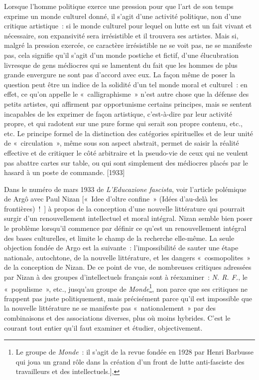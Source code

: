 \documentclass[french,twoside]{book} %
\begin{document}
Lorsque l’homme politique exerce une pression pour que l’art de son temps exprime un monde culturel donné, il s’agit d’une activité politique, non d’une critique artistique : si le monde culturel pour lequel on lutte est un fait vivant et nécessaire, son expansivité sera irrésistible et il trouvera ses artistes. Mais si, malgré la pression exercée, ce caractère irrésistible ne se voit pas, ne se manifeste pas, cela signifie qu’il s’agit d’un monde postiche et fictif, d’une élucubration livresque de gens médiocres qui se lamentent du fait que les hommes de plus grande envergure ne sont pas d’accord avec eux. La façon même de poser la question peut être un indice de la solidité d’un tel monde moral et culturel : en effet, ce qu’on appelle le « calligraphisme » n’est autre chose que la défense des petits artistes, qui affirment par opportunisme certains principes, mais se sentent incapables de les exprimer de façon artistique, c’est-à-dire par leur activité propre, et qui radotent sur une pure forme qui serait son propre contenu, etc., etc. Le principe formel de la distinction des catégories spirituelles et de leur unité de « circulation », même sous son aspect abstrait, permet de saisir la réalité effective et de critiquer le côté arbitraire et la pseudo-vie de ceux qui ne veulent pas abattre cartes sur table, ou qui sont simplement des médiocres placés par le hasard à un poste de commande. [1933]\par
Dans le numéro de mars 1933 de \emph{L'Educazione fascista}, voir l’article polémique de Argô avec Paul Nizan [« Idee d’oltre confine » (Idées d’au-delà les frontières) ! ] à propos de la conception d’une nouvelle littérature qui pourrait surgir d’un renouvellement intellectuel et moral intégral. Nizan semble bien poser le problème lorsqu’il commence par définir ce qu’est un renouvellement intégral des bases culturelles, et limite le champ de la recherche elle-même. La seule objection fondée de Argo est la suivante : l’impossibilité de sauter une étape nationale, autochtone, de la nouvelle littérature, et les dangers « cosmopolites » de la conception de Nizan. De ce point de vue, de nombreuses critiques adressées par Nizan à des groupes d’intellectuels français sont à réexaminer : \emph{N. R. F.}, le « populisme », etc., jusqu’au groupe de \emph{Monde}\footnote{Le groupe de \emph{Monde} : il s’agit de la revue fondée en 1928 par Henri Barbusse qui joua un grand rôle dans la création d’un front de lutte anti-fasciste des travailleurs et des intellectuels.],}, non parce que ses critiques ne frappent pas juste politiquement, mais précisément parce qu’il est impossible que la nouvelle littérature ne se manifeste pas « nationalement » par des combinaisons et des associations diverses, plus où moins hybrides. C'est le courant tout entier qu’il faut examiner et étudier, objectivement.\par
\end{document}
